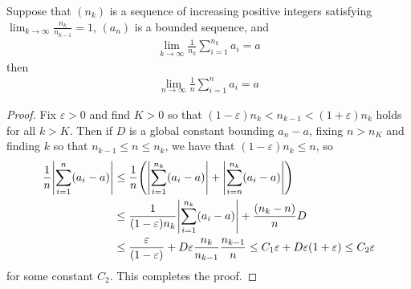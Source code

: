 \documentclass[12pt]{article}
\theoremstyle{definition}
\theoremstyle{remark}
\newcommand{\ve}{\varepsilon}
\begin{document}
	Suppose that $(n_k)$ is a sequence of increasing positive integers satisfying $\lim_{k \to \infty} \frac{n_k}{n_{k-1}} = 1$, $(a_n)$ is a bounded sequence, and 
	\begin{align*}
		\lim_{k \to \infty} \frac{1}{n_k}\sum_{i=1}^{n_k} a_i = a
	\end{align*}
	then 
	\begin{align*}
		\lim_{n\to \infty} \frac 1n \sum_{i=1}^n a_i = a
	\end{align*}
	
	\begin{proof}
		Fix $\varepsilon > 0$ and find $K > 0$ so that $(1-\ve)n_{k} < n_{k-1} < (1+\ve)n_{k}$ holds for all $k > K$. Then if $D$ is a global constant bounding $a_n-a$, fixing $n > n_K$ and finding $k$ so that $n_{k-1} \leq n \leq n_k$, we have that $(1-\ve)n_{k} \leq n$, so 
		\begin{align*}
			\frac 1n \qty|\sum_{i=1}^n (a_i-a)| &\leq \frac 1n \qty(\qty|\sum_{i=1}^{n_k} (a_i-a)| + \qty|\sum_{i=n}^{n_k} (a_i-a)|) \\
			&\leq \frac{1}{(1-\ve)n_k} \qty|\sum_{i=1}^{n_k} (a_i-a)| + \frac{(n_k-n)}{n} D \\
			&\leq \frac{\ve}{(1-\ve)} + D\ve\frac{n_k}{n_{k-1}} \frac{n_{k-1}}{n} \leq C_1\ve + D\ve (1+\ve) \leq C_2\ve
		\end{align*}
		for some constant $C_2$. This completes the proof.
	\end{proof}
\end{document}

